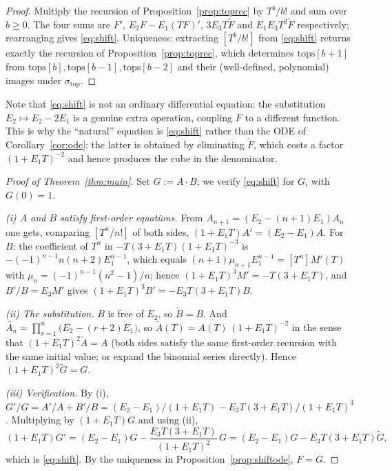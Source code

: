 \documentclass[10pt]{article}
\theoremstyle{plain}
\theoremstyle{definition}
\newcommand{\sigtop}{\sigma_{\mathrm{top}}}
\begin{document}
\begin{proof}
Multiply the recursion of Proposition~\ref{prop:toprec} by $T^b/b!$ and sum over $b\ge0$.
The four sums are $F'$, $E_2F-E_1(TF)'$, $3E_3T\widetilde F$ and $E_1E_3T^2\widetilde F$
respectively; rearranging gives \eqref{eq:shift}. Uniqueness: extracting $[T^b/b!]$ from
\eqref{eq:shift} returns exactly the recursion of Proposition~\ref{prop:toprec}, which
determines $\mathrm{tops}[b+1]$ from $\mathrm{tops}[b],\mathrm{tops}[b-1],
\mathrm{tops}[b-2]$ and their (well-defined, polynomial) images under $\sigtop$.
\end{proof}

Note that \eqref{eq:shift} is not an ordinary differential equation: the substitution
$E_2\mapsto E_2-2E_1$ is a genuine extra operation, coupling $F$ to a different function.
This is why the ``natural'' equation is \eqref{eq:shift} rather than the ODE of
Corollary~\ref{cor:ode}: the latter is obtained by eliminating $\widetilde F$, which costs a
factor $(1+E_1T)^{-2}$ and hence produces the cube in the denominator.

\begin{proof}[Proof of Theorem~\ref{thm:main}]
Set $G:=A\cdot B$; we verify \eqref{eq:shift} for $G$, with $G(0)=1$.

\emph{(i) $A$ and $B$ satisfy first-order equations.} From $A_{n+1}=(E_2-(n+1)E_1)A_n$ one
gets, comparing $[T^n/n!]$ of both sides, $(1+E_1T)A'=(E_2-E_1)A$. For $B$: the coefficient
of $T^n$ in $-T(3+E_1T)(1+E_1T)^{-3}$ is $-(-1)^{n-1}n(n+2)E_1^{n-1}$, which equals
$(n+1)\mu_{n+1}E_1^{n-1}=[T^n]M'(T)$ with $\mu_n=(-1)^{n-1}(n^2-1)/n$; hence
$(1+E_1T)^3M'=-T(3+E_1T)$, and $B'/B=E_3M'$ gives
$(1+E_1T)^3B'=-E_3T(3+E_1T)B$.

\emph{(ii) The substitution.} $B$ is free of $E_2$, so $\widetilde B=B$. And
$\widetilde{A_n}=\prod_{r=1}^n\big(E_2-(r+2)E_1\big)$, so
$\widetilde A(T)=A(T)\,(1+E_1T)^{-2}$ in the sense that
$(1+E_1T)^2\widetilde A=A$ (both sides satisfy the same first-order recursion with the same
initial value; or expand the binomial series directly). Hence
$(1+E_1T)^2\widetilde G=G$.

\emph{(iii) Verification.} By (i), $G'/G=A'/A+B'/B=(E_2-E_1)/(1+E_1T)
-E_3T(3+E_1T)/(1+E_1T)^3$. Multiplying by $(1+E_1T)G$ and using (ii),
\[
 (1+E_1T)G'=(E_2-E_1)G-\frac{E_3T(3+E_1T)}{(1+E_1T)^2}\,G
 =(E_2-E_1)G-E_3T(3+E_1T)\widetilde G,
\]
which is \eqref{eq:shift}. By the uniqueness in Proposition~\ref{prop:shiftode}, $F=G$.
\end{proof}
\end{document}
